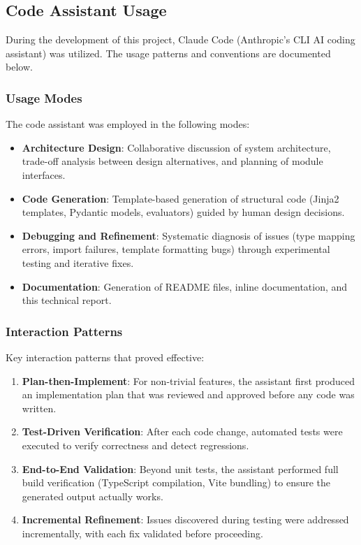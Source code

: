 \documentclass[11pt,a4paper]{article}
\begin{document}
\subsection{Code Assistant Usage}

During the development of this project, Claude Code (Anthropic's CLI AI coding assistant) was utilized. The usage patterns and conventions are documented below.

\subsubsection{Usage Modes}

The code assistant was employed in the following modes:

\begin{itemize}
    \item \textbf{Architecture Design}: Collaborative discussion of system architecture, trade-off analysis between design alternatives, and planning of module interfaces.
    \item \textbf{Code Generation}: Template-based generation of structural code (Jinja2 templates, Pydantic models, evaluators) guided by human design decisions.
    \item \textbf{Debugging and Refinement}: Systematic diagnosis of issues (type mapping errors, import failures, template formatting bugs) through experimental testing and iterative fixes.
    \item \textbf{Documentation}: Generation of README files, inline documentation, and this technical report.
\end{itemize}

\subsubsection{Interaction Patterns}

Key interaction patterns that proved effective:

\begin{enumerate}[leftmargin=*]
    \item \textbf{Plan-then-Implement}: For non-trivial features, the assistant first produced an implementation plan that was reviewed and approved before any code was written.
    \item \textbf{Test-Driven Verification}: After each code change, automated tests were executed to verify correctness and detect regressions.
    \item \textbf{End-to-End Validation}: Beyond unit tests, the assistant performed full build verification (TypeScript compilation, Vite bundling) to ensure the generated output actually works.
    \item \textbf{Incremental Refinement}: Issues discovered during testing were addressed incrementally, with each fix validated before proceeding.
\end{enumerate}
\end{document}
